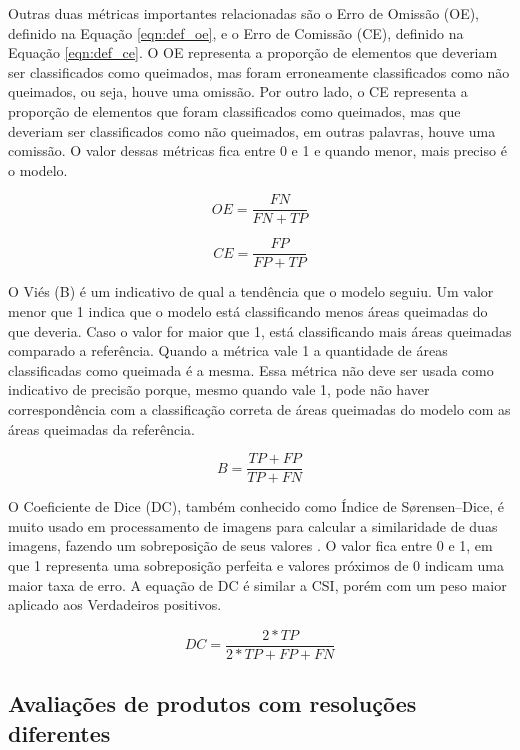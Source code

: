 \documentclass[cic,tc]{iiufrgs}
\begin{document}
Outras duas métricas importantes relacionadas são o Erro de Omissão (OE), definido na Equação \ref{eqn:def_oe}, e o Erro de Comissão (CE), definido na Equação \ref{eqn:def_ce}. O OE representa a proporção de elementos que deveriam ser classificados como queimados, mas foram erroneamente classificados como não queimados, ou seja, houve uma omissão. Por outro lado, o CE representa a proporção de elementos que foram classificados como queimados, mas que deveriam ser classificados como não queimados, em outras palavras, houve uma comissão. O valor dessas métricas fica entre 0 e 1 e quando menor, mais preciso é o modelo.

\begin{equation} \label{eqn:def_oe}
  OE = \frac{FN}{FN + TP}
\end{equation}

\begin{equation} \label{eqn:def_ce}
  CE = \frac{FP}{FP + TP}
\end{equation}

O Viés (B) é um indicativo de qual a tendência que o modelo seguiu. Um valor menor que 1 indica que o modelo está classificando menos áreas queimadas do que deveria. Caso o valor for maior que 1, está classificando mais áreas queimadas comparado a referência. Quando a métrica vale 1 a quantidade de áreas classificadas como queimada é a mesma. Essa métrica não deve ser usada como indicativo de precisão porque, mesmo quando vale 1, pode não haver correspondência com a classificação correta de áreas queimadas do modelo com as áreas queimadas da referência.

\begin{equation} \label{eqn:def_b}
  B = \frac{TP + FP}{TP + FN}
\end{equation}

O Coeficiente de Dice (DC), também conhecido como Índice de Sørensen–Dice, é muito usado em processamento de imagens para calcular a similaridade de duas imagens, fazendo um sobreposição de seus valores \citep{livro-dice}. O valor fica entre 0 e 1, em que 1 representa uma sobreposição perfeita e valores próximos de 0 indicam uma maior taxa de erro. A equação de DC é similar a CSI, porém com um peso maior aplicado aos Verdadeiros positivos.

\begin{equation} \label{eqn:def_dc}
  DC = \frac{2 * TP}{2 * TP + FP + FN}
\end{equation}

\subsection*{Avaliações de produtos com resoluções diferentes}
\end{document}
